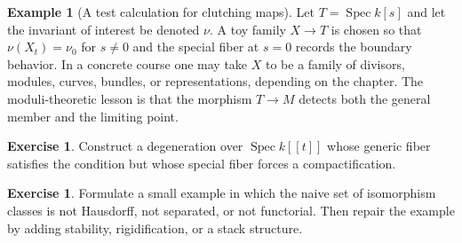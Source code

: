 \documentclass[11pt]{amsart}
\theoremstyle{definition}
\newtheorem{example}[theorem]{Example}
\newtheorem{exercise}[theorem]{Exercise}
\newcommand{\Spec}{\operatorname{Spec}}
\begin{document}
\begin{example}[A test calculation for clutching maps]
Let $T=\Spec k[s]$ and let the invariant of interest be denoted $\nu$.  A toy family $X\to T$ is chosen so that $\nu(X_t)=\nu_0$ for $s\ne0$ and the special fiber at $s=0$ records the boundary behavior.  In a concrete course one may take $X$ to be a family of divisors, modules, curves, bundles, or representations, depending on the chapter.  The moduli-theoretic lesson is that the morphism $T\to M$ detects both the general member and the limiting point.
\end{example}
\begin{exercise}
Construct a degeneration over $\Spec k[[t]]$ whose generic fiber satisfies the condition but whose special fiber forces a compactification.
\end{exercise}
\begin{exercise}
Formulate a small example in which the naive set of isomorphism classes is not Hausdorff, not separated, or not functorial.  Then repair the example by adding stability, rigidification, or a stack structure.
\end{exercise}
\clearpage
\end{document}
